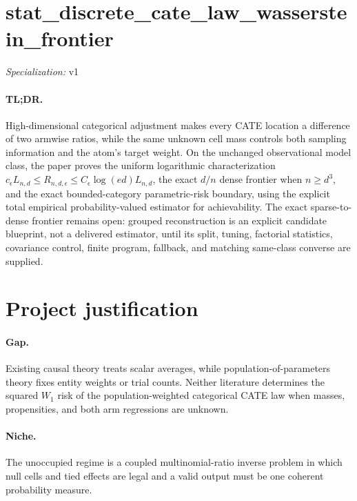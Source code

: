 \documentclass{article}
\begin{document}
\sloppy

\section*{stat\_\allowbreak{}discrete\_\allowbreak{}cate\_\allowbreak{}law\_\allowbreak{}wasserstein\_\allowbreak{}frontier}

\noindent\textit{Specialization:} v1\par

\paragraph{TL;DR.} High-dimensional categorical adjustment makes every CATE location a difference of two armwise ratios, while the same unknown cell mass controls both sampling information and the atom's target weight.  On the unchanged observational model class, the paper proves the uniform logarithmic characterization \(c_\epsilon L_{n,d}\le R_{n,d,\epsilon}\le C_\epsilon\log(ed)L_{n,d}\), the exact \(d/n\) dense frontier when \(n\ge d^3\), and the exact bounded-category parametric-risk boundary, using the explicit total empirical probability-valued estimator for achievability.  The exact sparse-to-dense frontier remains open: grouped reconstruction is an explicit candidate blueprint, not a delivered estimator, until its split, tuning, factorial statistics, covariance control, finite program, fallback, and matching same-class converse are supplied.

\section{Project justification}

\paragraph{Gap.} Existing causal theory treats scalar averages, while population-of-parameters theory fixes entity weights or trial counts. Neither literature determines the squared \(W_1\) risk of the population-weighted categorical CATE law when masses, propensities, and both arm regressions are unknown.

\paragraph{Niche.} The unoccupied regime is a coupled multinomial-ratio inverse problem in which null cells and tied effects are legal and a valid output must be one coherent probability measure.
\end{document}
